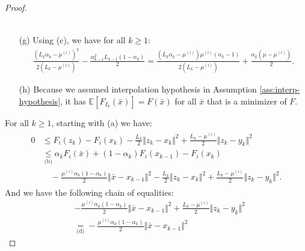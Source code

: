\documentclass[12pt]{article}
\begin{document}
\begin{proof}
\begin{itemize}
\begin{align*}
                \end{align*}
                \item [(g)] Using (c), we have for all $k \ge 1$: 
                \begin{align*}
                    \frac{\left(
                        L_k\alpha_k - \mu^{(i)}
                    \right)^2}{2(L_k - \mu^{(i)})} 
                    -
                    \frac{\alpha_{k - 1}^2L_{k - 1}(1 - \alpha_k)}{2} 
                    = 
                    \frac{
                        \left(L_k \alpha_k - \mu^{(i)}\right)\mu^{(i)}
                        \left(\alpha_k - 1\right)
                    }
                    {2(L_k - \mu^{(i)})}
                    + \frac{\alpha_k(\mu - \mu^{(i)})}{2}. 
                \end{align*}
                \item[(h)] Because we assumed interpolation hypothesis in Assumption \ref{ass:interp-hypothesis}, it has $\mathbb E[F_{I_k}(\bar x)] = F(\bar x)$ for all $\bar x$ that is a minimizer of $F$. 
            \end{itemize}
            For all $k \ge 1$, starting with (a) we have: 
            \begin{align}\label{ineq:snapg2-one-step-chain1}
                \begin{split}
                    0 &\le F_i(z_k) - F_i(x_k) - \frac{L_k}{2}\Vert z_k - x_k\Vert^2 + \frac{L_k - \mu^{(i)}}{2}\Vert z_k - y_k\Vert^2
                    \\
                    &\underset{\text{(b)}}{\le}
                    \alpha_k F_i(\bar x) + (1 - \alpha_k)F_i(x_{k - 1}) - F_i(x_k) \\
                        &\quad 
                        - \frac{\mu^{(i)}\alpha_k(1 - \alpha_k)}{2}\Vert \bar x - x_{k - 1}\Vert^2
                        - \frac{L_k}{2}\Vert z_k - x_k\Vert^2 
                        + \frac{L_k - \mu^{(i)}}{2}\Vert z_k - y_k\Vert^2. 
                \end{split}
            \end{align}
            And we have the following chain of equalities:
            {\allowdisplaybreaks
            \begin{align*}
                & - \frac{\mu^{(i)}\alpha_k(1 - \alpha_k)}{2}\Vert \bar x - x_{k - 1}\Vert^2
                + \frac{L_k - \mu^{(i)}}{2}\Vert z_k - y_k\Vert^2
                \\
                &\underset{\text{(d)}}{=}
                - \frac{\mu^{(i)}\alpha_k(1 - \alpha_k)}{2}\Vert \bar x - x_{k - 1}\Vert^2 

\end{align*}}
\end{proof}
\end{document}
